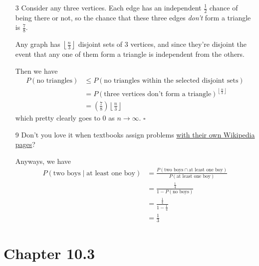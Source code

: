 \documentclass[12pt]{article}
\begin{document}
\begin{enumerate}
    \item[3] Consider any three vertices.
        Each edge has an independent $\frac{1}{2}$ chance of being there or not,
        so the chance that these three edges \textit{don't} form a triangle is $\frac{7}{8}$.

        Any graph has $\left\lfloor \frac{n}{3} \right\rfloor$ disjoint
        sets of $3$ vertices, and since they're disjoint the event that
        any one of them form a triangle is independent from the others.

        Then we have
        \begin{align*}
            P(\text{no triangles})
             & \le P(\text{no triangles within the selected disjoint sets})                              \\
             & = P(\text{three vertices don't form a triangle})^{\left\lfloor \frac{n}{3} \right\rfloor} \\
             & = \left(\frac{7}{8}\right)\left\lfloor \frac{n}{3} \right\rfloor
        \end{align*}
        which pretty clearly goes to $0$ as $n \to \infty$. $\square$

    \item[9] Don't you love it when textbooks assign problems
        \href{https://en.wikipedia.org/wiki/Boy_or_girl_paradox}{with their own Wikipedia pages}?

        Anyways, we have
        \begin{align*}
            P(\text{two boys} \mid \text{at least one boy})
             & = \frac{P(\text{two boys} \cap \text{at least one boy})}{P(\text{at least one boy})} \\
             & = \frac{\frac{1}{4}}{1-P(\text{no boys})}                                            \\
             & = \frac{\frac{1}{4}}{1-\frac{1}{4}}                                                  \\
             & = \boxed{\frac{1}{3}}
        \end{align*}
\end{enumerate}

\pagebreak

\section{Chapter 10.3}
\end{document}
